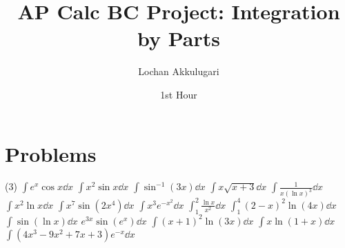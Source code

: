 \documentclass{article}
\title{AP Calc BC Project: Integration by Parts}
\author{Lochan Akkulugari}
\date{1st Hour}
\newcommand{\indisp}[1]{\(\displaystyle #1\)}
\begin{document}
	\maketitle
		\section*{Problems}
			\begin{tasks}[style = enumerate](3)
				\task
					\indisp{\int e^x\cos x \dd{x}}
				\task
					\indisp{\int x^2\sin x \dd{x}}
				\task
					\indisp{\int \sin^{-1}(3x) \dd{x}}
				\task
					\indisp{\int x\sqrt{x + 3} \dd{x}}
				\task
					\indisp{\int \frac{1}{x(\ln x)^3} \dd{x}}
				\task
					\indisp{\int x^2 \ln x \dd{x}}
				\task
					\indisp{\int x^7\sin(2x^4) \dd{x}}
				\task
					\indisp{\int x^3e^{-x^2} \dd{x}}
				\task
					\indisp{\int_1^2 \frac{\ln x}{x^2} \dd{x}}
				\task
					\indisp{\int_1^4 (2 - x)^2\ln(4x) \dd{x}}
				\task
					\indisp{\int \sin(\ln x) \dd{x}}
				\task
					\indisp{e^{3x}\sin(e^x) \dd{x}}
				\task
					\indisp{\int (x + 1)^2 \ln(3x) \dd{x}}
				\task
					\indisp{\int x\ln(1 + x) \dd{x}}
				\task
					\indisp{\int (4x^3 - 9x^2 + 7x + 3)e^{-x} \dd{x}}
			\end{tasks}
		\newpage
\end{document}
